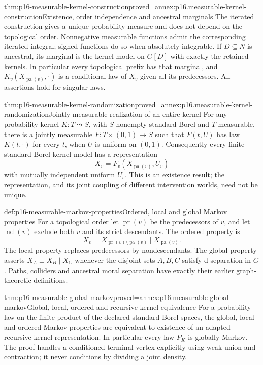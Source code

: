 \begin{hbtheorem}{thm:p16-measurable-kernel-construction}{proved=annex:p16.measurable-kernel-construction}{Existence, order independence and ancestral marginals}
The iterated construction gives a unique probability measure and does not
depend on the topological order. Nonnegative measurable functions admit
the corresponding iterated integral; signed functions do so when absolutely
integrable. If \(D\subseteq N\) is ancestral, its marginal is the kernel
model on \(G[D]\) with exactly the retained kernels. In particular every
topological prefix has that marginal, and
\(K_v(X_{\operatorname{pa}(v)},\cdot)\) is a conditional law of \(X_v\)
given all its predecessors. All assertions hold for singular laws.
\end{hbtheorem}

\begin{hbtheorem}{thm:p16-measurable-kernel-randomization}{proved=annex:p16.measurable-kernel-randomization}{Jointly measurable realization of an entire kernel}
For any probability kernel \(K:T\leadsto S\), with \(S\) nonempty
standard Borel and \(T\) measurable, there is a jointly measurable
\(F:T\times(0,1)\to S\) such that \(F(t,U)\) has law \(K(t,\cdot)\)
for every \(t\), when \(U\) is uniform on \((0,1)\).
Consequently every finite standard Borel kernel model has a representation
\[
 X_v=F_v(X_{\operatorname{pa}(v)},U_v)
\]
with mutually independent uniform \(U_v\). This is an existence result;
the representation, and its joint coupling of different intervention
worlds, need not be unique.
\end{hbtheorem}

\begin{hbdefinition}{def:p16-measurable-markov-properties}{Ordered, local and global Markov properties}
For a topological order let \(\operatorname{pr}(v)\) be the predecessors
of \(v\), and let \(\operatorname{nd}(v)\) exclude both \(v\) and its
strict descendants. The ordered property is
\[
 X_v\perp X_{\operatorname{pr}(v)\setminus\operatorname{pa}(v)}
               \mid X_{\operatorname{pa}(v)}.
\]
The local property replaces predecessors by nondescendants. The global
property asserts \(X_A\perp X_B\mid X_C\) whenever the disjoint sets
\(A,B,C\) satisfy d-separation in \(G\). Paths, colliders and ancestral
moral separation have exactly their earlier graph-theoretic definitions.
\end{hbdefinition}

\begin{hbtheorem}{thm:p16-measurable-global-markov}{proved=annex:p16.measurable-global-markov}{Global, local, ordered and recursive-kernel equivalence}
For a probability law on the finite product of the declared standard
Borel spaces, the global, local and ordered Markov properties are
equivalent to existence of an adapted recursive kernel representation.
In particular every law \(P_K\) is globally Markov. The proof handles
a conditioned terminal vertex explicitly using weak union and contraction;
it never conditions by dividing a joint density.
\end{hbtheorem}

